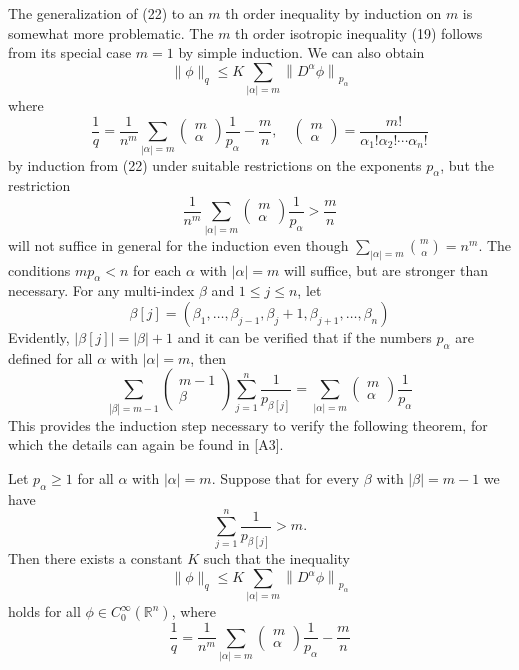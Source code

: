 \begin{para}
  The generalization of (22) to an $m$ th order inequality by induction on $m$ is somewhat more 
  problematic.
  The $m$ th order isotropic inequality (19) follows from its special case $m=1$ by simple induction.
  We can also obtain
  \[
  \|\phi\|_q \leq K \sum_{|\alpha|=m}\left\|D^\alpha \phi\right\|_{p_\alpha}
  \]
  where
  \[
  \frac{1}{q}=\frac{1}{n^m} \sum_{|\alpha|=m}\left(\begin{array}{c}
  m \\
  \alpha
  \end{array}\right) \frac{1}{p_\alpha}-\frac{m}{n}, \quad\left(\begin{array}{c}
  m \\
  \alpha
  \end{array}\right)=\frac{m !}{\alpha_{1} ! \alpha_{2} ! \cdots \alpha_{n} !}
  \]
  by induction from (22) under suitable restrictions on the exponents $p_\alpha$, but the restriction
  \[
  \frac{1}{n^m} \sum_{|\alpha|=m}\left(\begin{array}{l}
  m \\
  \alpha
  \end{array}\right) \frac{1}{p_\alpha}>\frac{m}{n}
  \]
  will not suffice in general for the induction even though $\sum_{|\alpha|=m} \binom{m}{\alpha} = n^m$.
  The conditions $m p_\alpha<n$ for each $\alpha$ with $|\alpha|=m$ will suffice, but are stronger than 
  necessary. For any multi-index $\beta$ and $1 \leq j \leq n$, let
  \[
  \beta[j]=\left(\beta_1, \ldots, \beta_{j-1}, \beta_j+1, \beta_{j+1}, \ldots, \beta_n\right)
  \]
  Evidently, $|\beta[j]|=|\beta|+1$ and it can be verified that if the numbers $p_\alpha$ are defined for all $\alpha$ with $|\alpha|=m$, then
  \[
  \sum_{|\beta|=m-1}\left(\begin{array}{c}
  m-1 \\
  \beta
  \end{array}\right) \sum_{j=1}^n \frac{1}{p_{\beta[j]}}=\sum_{|\alpha|=m}\left(\begin{array}{c}
  m \\
  \alpha
  \end{array}\right) \frac{1}{p_\alpha}
  \]
  This provides the induction step necessary to verify the following theorem,
  for which the details can again be found in [A3].
\end{para}


\begin{theorem}
  Let $p_\alpha \geq 1$ for all $\alpha$ with $|\alpha|=m$.
  Suppose that for every $\beta$ with $|\beta|=m-1$ we have
  \[
  \sum_{j=1}^n \frac{1}{p_{\beta[j]}}>m .
  \]
  Then there exists a constant $K$ such that the inequality
  \[
  \|\phi\|_q \leq K \sum_{|\alpha|=m}\left\|D^\alpha \phi\right\|_{p_\alpha}
  \]
  holds for all $\phi \in C_0^{\infty}\left(\mathbb{R}^n\right)$, where
  \[
  \frac{1}{q}=\frac{1}{n^m} \sum_{|\alpha|=m}\left(\begin{array}{c}
  m \\
  \alpha
  \end{array}\right) \frac{1}{p_\alpha}-\frac{m}{n}
  \]
\end{theorem}


